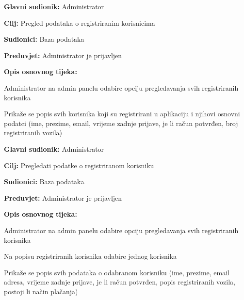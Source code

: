 \noindent {}
\begin{packed_item}
	
	\item \textbf{Glavni sudionik:} Administrator
	\item  \textbf{Cilj:} Pregled podataka o registriranim korisnicima
	\item  \textbf{Sudionici:} Baza podataka
	\item  \textbf{Preduvjet:} Administrator je prijavljen
	\item  \textbf{Opis osnovnog tijeka:}
	
	\item[] \begin{packed_enum}
		
		\item Administrator na admin panelu odabire opciju pregledavanja svih registriranih korisnika 
		\item Prikaže se popis svih korisnika koji su registrirani u aplikaciju i njihovi osnovni podatci (ime, prezime, email, vrijeme zadnje prijave, je li račun potvrđen, broj registriranih vozila)

	\end{packed_enum}
\end{packed_item}

\noindent {}
\begin{packed_item}
	
	\item \textbf{Glavni sudionik:} Administrator
	\item  \textbf{Cilj:} Pregledati podatke o registriranom korisniku
	\item  \textbf{Sudionici:} Baza podataka
	\item  \textbf{Preduvjet:} Administrator je prijavljen
	\item  \textbf{Opis osnovnog tijeka:}
	
	\item[] \begin{packed_enum}

		\item Administrator na admin panelu odabire opciju pregledavanja svih registriranih korisnika 
		\item Na popisu registriranih korisnika odabire jednog korisnika
		\item Prikaže se popis svih podataka o odabranom korisniku (ime, prezime, email adresa, vrijeme zadnje prijave, je li račun potvrđen, popis registriranih vozila, postoji li način plačanja)

	\end{packed_enum}
\end{packed_item}

